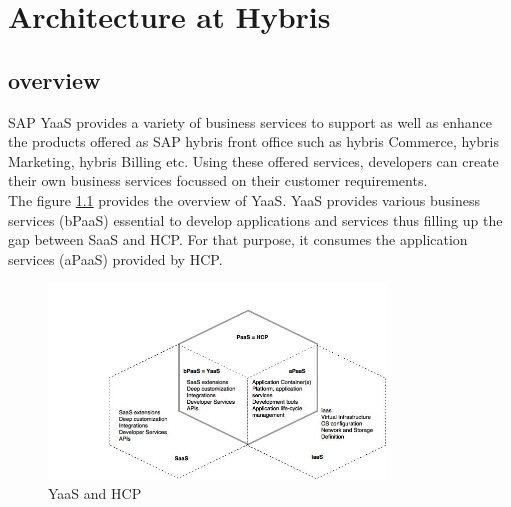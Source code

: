 \chapter{Architecture at Hybris}\label{chapter:hybris_architecture}
\section{overview}\label{section:hybris_architecture/overview}
SAP \acrshort{YaaS} provides a variety of business services to support as well as enhance the products offered as SAP hybris front office such as hybris Commerce, hybris Marketing, hybris Billing etc. Using these offered services, developers can create their own business services focussed on their customer requirements.\\
The figure \ref{fig:hybris_architecture/overview/yaas_overview} provides the overview of \acrshort{YaaS}. \acrshort{YaaS} provides various business services (bPaaS) essential to develop applications and services thus filling up the gap between SaaS and HCP. For that purpose, it consumes the application services (aPaaS) provided by \acrshort{HCP}.
\begin{figure}[H]
\begin{center}
\includegraphics[width=0.8\textwidth]{figures/hybris-architecture-one}
\caption{\acrshort{YaaS} and \acrshort{HCP} \cite{Hirsch:2015aa}}
\label{fig:hybris_architecture/overview/yaas_overview}
\end{center}
\end{figure}